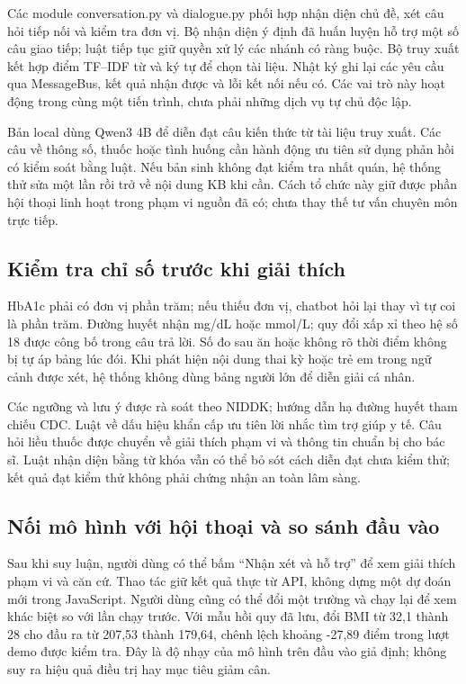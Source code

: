Các module conversation.py và dialogue.py phối hợp nhận diện chủ đề, xét câu hỏi tiếp nối và kiểm tra đơn vị. Bộ nhận diện ý định đã huấn luyện hỗ trợ một số câu giao tiếp; luật tiếp tục giữ quyền xử lý các nhánh có ràng buộc. Bộ truy xuất kết hợp điểm TF--IDF từ và ký tự để chọn tài liệu. Nhật ký ghi lại các yêu cầu qua MessageBus, kết quả nhận được và lỗi kết nối nếu có. Các vai trò này hoạt động trong cùng một tiến trình, chưa phải những dịch vụ tự chủ độc lập.

Bản local dùng Qwen3 4B để diễn đạt câu kiến thức từ tài liệu truy xuất. Các câu về thông số, thuốc hoặc tình huống cần hành động ưu tiên sử dụng phản hồi có kiểm soát bằng luật. Nếu bản sinh không đạt kiểm tra nhất quán, hệ thống thử sửa một lần rồi trở về nội dung KB khi cần. Cách tổ chức này giữ được phần hội thoại linh hoạt trong phạm vi nguồn đã có; chưa thay thế tư vấn chuyên môn trực tiếp.
\subsection{Kiểm tra chỉ số trước khi giải thích}
HbA1c phải có đơn vị phần trăm; nếu thiếu đơn vị, chatbot hỏi lại thay vì tự coi là phần trăm. Đường huyết nhận mg/dL hoặc mmol/L; quy đổi xấp xỉ theo hệ số 18 được công bố trong câu trả lời. Số đo sau ăn hoặc không rõ thời điểm không bị tự áp bảng lúc đói. Khi phát hiện nội dung thai kỳ hoặc trẻ em trong ngữ cảnh được xét, hệ thống không dùng bảng người lớn để diễn giải cá nhân.

Các ngưỡng và lưu ý được rà soát theo NIDDK; hướng dẫn hạ đường huyết tham chiếu CDC. Luật về dấu hiệu khẩn cấp ưu tiên lời nhắc tìm trợ giúp y tế. Câu hỏi liều thuốc được chuyển về giải thích phạm vi và thông tin chuẩn bị cho bác sĩ. Luật nhận diện bằng từ khóa vẫn có thể bỏ sót cách diễn đạt chưa kiểm thử; kết quả đạt kiểm thử không phải chứng nhận an toàn lâm sàng.
\subsection{Nối mô hình với hội thoại và so sánh đầu vào}
Sau khi suy luận, người dùng có thể bấm ``Nhận xét và hỗ trợ'' để xem giải thích phạm vi và căn cứ. Thao tác giữ kết quả thực từ API, không dựng một dự đoán mới trong JavaScript. Người dùng cũng có thể đổi một trường và chạy lại để xem khác biệt so với lần chạy trước. Với mẫu hồi quy đã lưu, đổi BMI từ 32,1 thành 28 cho đầu ra từ 207,53 thành 179,64, chênh lệch khoảng -27,89 điểm trong lượt demo được kiểm tra. Đây là độ nhạy của mô hình trên đầu vào giả định; không suy ra hiệu quả điều trị hay mục tiêu giảm cân.
